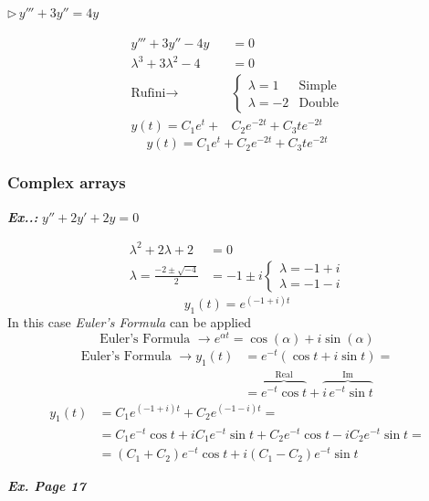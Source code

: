 \documentclass[a4paper]{article}
\begin{document}
$\triangleright\, y'''+3y''=4y$

\begin{align}
y'''+3y''-4y&=0 \\
\lambda^{3}+3\lambda^{2}-4&=0 \\
\text{Rufini}\to &\begin{cases}
\lambda=1 & \text{Simple} \\
\lambda=-2 & \text{Double}
\end{cases} \\
y(t)=C_{1}e^{ t }+&C_{2}e^{ -2t }+C_{3}te^{ -2t }
\end{align}
$$
\boxed{y(t)=C_{1}e^{ t }+C_{2}e^{ -2t }+C_{3}te^{ -2t }}
$$
\subsubsection{Complex arrays}
\setcounter{equation}{0}

\vspace{2ex}\textbf{\textit{Ex.\thesection.\theex: }}$y''+2y'+2y=0$

\begin{align}
\lambda^{2}+2\lambda+2&=0 \\
\lambda=\frac{-2\pm \sqrt{ -4 }}{2}&=-1\pm i \begin{cases}
\lambda=-1+i \\
\lambda=-1-i
\end{cases}
\end{align}
$$
y_{1}(t)=e^{ (-1+i)t }
$$
In this case \textit{Euler's Formula} can be applied
$$
\text{Euler's Formula }\to e^{\alpha t}=\cos(\alpha)+i\sin(\alpha) 
$$
\begin{align}
\text{Euler's Formula }\to y_{1} (t)&=e^{ -t }(\cos t+i\sin t)= \\
&=\overbrace{e^{ -t }\cos t}^{\text{Real}}+\overbrace{i\,e^{ -t}\sin t}^{\text{Im}}
\end{align}
\begin{align}
y_{1}(t)&=C_{1}e^{ (-1+i)t }+C_{2}e^{ (-1-i )t}= \\
&=C_{1}e^{ -t }\cos t+iC_{1}e^{ -t }\sin t+C_{2}e^{ -t }\cos t-iC_{2}e^{ -t }\sin t= \\
&=(C_{1}+C_{2})e^{ -t }\cos t+i(C_{1}-C_{2})e^{ -t }\sin t
\end{align}

\textbf{\textit{Ex. Page 17}}
\end{document}
